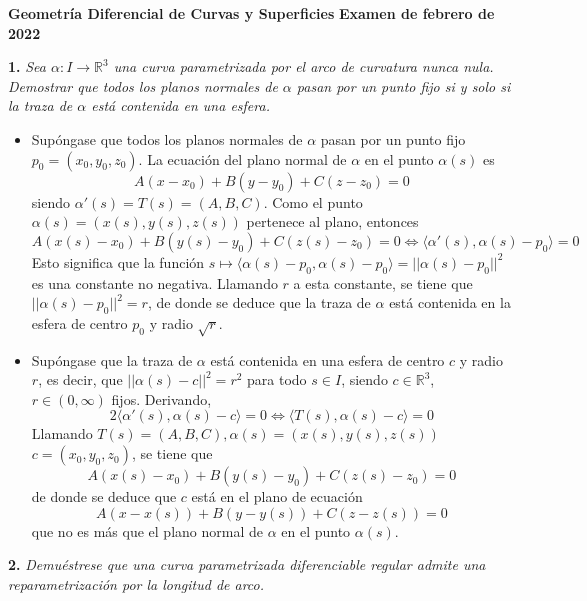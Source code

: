\documentclass[12pt]{report}
\newcommand{\R}{\mathbb R}
\begin{document}
\small

\textbf{Geometría Diferencial de Curvas y Superficies} \hfill \textbf{Examen de febrero de 2022}
\linebreak

\textbf{1. } \textit{Sea $\alpha \colon I \to \R^3$ una curva parametrizada por el arco de curvatura nunca nula. Demostrar que todos los planos normales de $\alpha$ pasan por un punto fijo si y solo si la traza de $\alpha$ está contenida en una esfera.}

\begin{itemize}
    \item[{\fbox[rb]{$\Rightarrow$}}] Supóngase que todos los planos normales de $\alpha$ pasan por un punto fijo $p_0 = (x_0,y_0,z_0)$. La ecuación del plano normal de $\alpha$ en el punto $\alpha(s)$ es
    \[A(x-x_0)+B(y-y_0)+C(z-z_0) = 0\]
    siendo $\alpha'(s) = T(s) = (A,B,C)$. Como el punto $\alpha(s) = (x(s),y(s),z(s))$ pertenece al plano, entonces
    \[A(x(s)-x_0)+B(y(s)-y_0)+C(z(s)-z_0) = 0 \iff \langle \alpha'(s),\alpha(s)-p_0 \rangle= 0\]
    Esto significa que la función $s \mapsto \langle \alpha(s)-p_0,\alpha(s)-p_0 \rangle = ||\alpha(s)-p_0||^2$ es una constante no negativa. Llamando $r$ a esta constante, se tiene que $||\alpha(s)-p_0||^2 = r$, de donde se deduce que la traza de $\alpha$ está contenida en la esfera de centro $p_0$ y radio $\sqrt{r}$.
    \item[{\fbox[rb]{$\Leftarrow$}}] Supóngase que la traza de $\alpha$ está contenida en una esfera de centro $c$ y radio $r$, es decir, que $||\alpha(s)-c||^2 = r^2$ para todo $s \in I$, siendo $c \in \R^3$, $r \in (0,\infty)$ fijos. Derivando,
    \[2\langle \alpha'(s),\alpha(s)-c \rangle = 0 \iff \langle T(s),\alpha(s)-c \rangle = 0\]
    Llamando $T(s) = (A,B,C), \alpha(s) = (x(s),y(s),z(s))$ $c = (x_0,y_0,z_0)$, se tiene que
    \[A(x(s)-x_0)+B(y(s)-y_0)+C(z(s)-z_0) = 0\]
    de donde se deduce que $c$ está en el plano de ecuación
    \[A(x-x(s))+B(y-y(s))+C(z-z(s)) = 0\]
    que no es más que el plano normal de $\alpha$ en el punto $\alpha(s)$.
\end{itemize}

\textbf{2. } \textit{Demuéstrese que una curva parametrizada diferenciable regular admite una reparametrización por la longitud de arco.}
\end{document}
